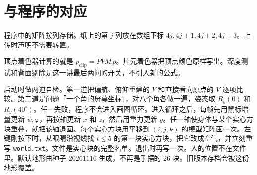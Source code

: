 \documentclass[12pt,a4paper]{article}
\theoremstyle{definition}
\theoremstyle{plain}
\theoremstyle{remark}
\begin{document}
\appendix
\section{与程序的对应}

程序中的矩阵按列存储。纸上的第 $j$ 列放在数组下标 $4j,4j+1,4j+2,4j+3$。上传时声明不需要转置。

顶点着色器计算的就是 $p_{\mathrm{clip}}=PVM\,p$。片元着色器把顶点颜色原样写出。深度测试和背面剔除是这一讲最后两问的开关，不引入新的公式。

启动时做两道自检。第一道把偏航、俯仰重建的 $V$ 和直接看向原点的 $V$ 逐项比较。第二道是问题「一个角的屏幕坐标」，对八个角各做一遍，姿态取 $R_y(0)$ 和 $R_y(40^\circ)$。任一失败，程序不会进入画图循环。进入循环之后，每帧先用鼠标增量更新 $\psi,\varphi$，再按轴更新 $x$ 和 $z$，然后用重力更新 $y$。任一轴使身体与某个实心方块重叠，就把该轴退回。每个实心方块用平移到 $(i,j,k)$ 的模型矩阵画一次。左键刚按下时，从眼睛沿视线找 \(t\le 5\) 的第一块实心方块，把它改成空气，并立刻重写 \texttt{world.txt}。文件是实心块的完整名单。退出时再写一次。人的位置不在文件里。默认地形由种子 \(20261116\) 生成，不再是手摆的 \(26\) 块。旧版本存档会被这份地形覆盖。
\end{document}
